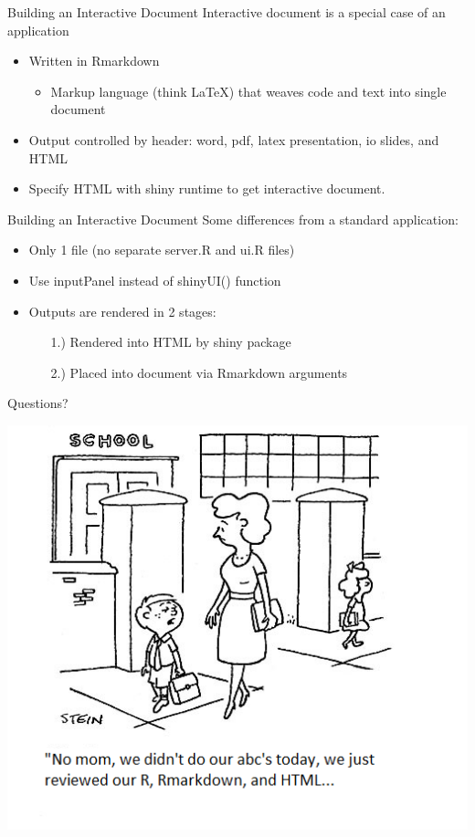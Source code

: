 \documentclass{beamer}\usepackage[]{graphicx}\usepackage[]{color}
\begin{document}
\begin{frame}{Building an Interactive Document}
Interactive document is a special case of an application
\pause
\bigskip
\begin{itemize}
\item Written in Rmarkdown
  \begin{itemize}
  \item Markup language (think \LaTeX) that weaves code and text into single document
  \end{itemize}
\pause
\bigskip
\item Output controlled by header: word, pdf, latex presentation, io slides, and HTML
\bigskip
\pause
\item Specify HTML with shiny runtime to get interactive document.
\end{itemize}  
\end{frame}


\begin{frame}{Building an Interactive Document}
Some differences from a standard application:
\bigskip
\pause
\begin{itemize}
\item Only 1 file (no separate server.R and ui.R files)
\pause
\bigskip
\item Use inputPanel instead of shinyUI() function
\bigskip
\pause
\item Outputs are rendered in 2 stages:
  \smallskip
  \begin{itemize}
  \item[1.)] Rendered into HTML by shiny package
  \smallskip
  \item[2.)] Placed into document via Rmarkdown arguments
  \end{itemize}
\end{itemize}
\end{frame}

\begin{frame}{Questions?}
\begin{center}
\includegraphics[scale=.5]{./Figures/codingcartoon.png}
\end{center}
\end{frame}
\end{document}
